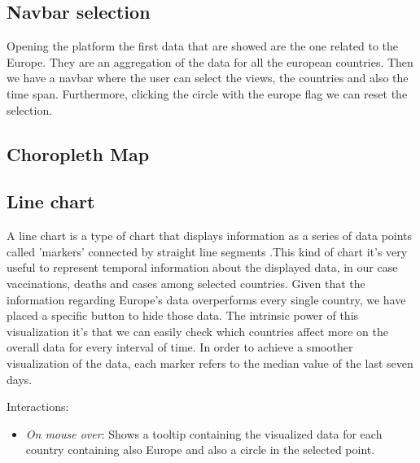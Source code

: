 \documentclass[10pt,conference]{IEEEtran}
\begin{document}
\subsection{Navbar selection}
Opening the platform the first data that are showed are the one related to the Europe. They are an aggregation of the data for all the european countries. 
Then we have a navbar where the user can select the views, the countries and also the time span. Furthermore, clicking the circle with 
the europe flag we can reset the selection.

\subsection{Choropleth Map}

\subsection{Line chart}
A line chart is a type of chart that displays information as a series of data points called ’markers’ connected by straight 
line segments \cite{line}.This kind of chart it’s very useful to represent temporal information about the displayed data,
in our case vaccinations, deaths and cases among selected countries. Given that the information regarding Europe's data 
overperforms every single country, we have placed a specific button to hide those data. The intrinsic power of this visualization it’s 
that we can easily check which countries affect more on the overall data for every interval of time.
In order to achieve a smoother visualization of the data, each marker refers to the median value of the last seven days.

Interactions:
\begin{itemize}
	\item {\em On mouse over}: Shows a tooltip containing the visualized data for each country containing also Europe and also a circle in the selected point.
\end{itemize}

\begin{figure}
\end{figure}
\end{document}
